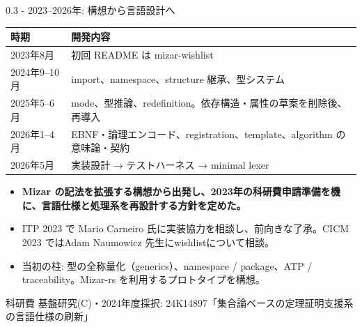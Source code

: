 \documentclass[dvipdfmx,aspectratio=169,11pt]{beamer}
\begin{document}
\begin{frame}[fragile,t]{0.3 - 2023–2026年: 構想から言語設計へ}
\par{}
\begin{footnotesize}
\setlength{\tabcolsep}{3pt}
\renewcommand{\arraystretch}{1.15}
\begin{tabularx}{\textwidth}{l>{\raggedright\arraybackslash}X}
\toprule
\textbf{時期} & \textbf{開発内容} \\
\midrule
2023年8月 & 初回 README は mizar-wishlist \\
2024年9–10月 & import、namespace、structure 継承、型システム \\
2025年5–6月 & mode、型推論、redefinition。依存構造・属性の草案を削除後、再導入 \\
2026年1–4月 & EBNF・論理エンコード、registration、template、algorithm の意味論・契約 \\
2026年5月 & 実装設計 → テストハーネス → minimal lexer \\
\bottomrule
\end{tabularx}
\end{footnotesize}

\begin{itemize}
\setlength{\itemsep}{1pt}
\setlength{\parsep}{0pt}
\setlength{\parskip}{0pt}
\item \textcolor{blue!55!black}{\textbf{Mizar の記法を拡張する構想から出発し、2023年の科研費申請準備を機に、言語仕様と処理系を再設計する方針を定めた。}}
\item ITP 2023 で Mario Carneiro 氏に実装協力を相談し、前向きな了承。CICM 2023 ではAdam Naumowicz 先生にwishlistについて相談。
\item 当初の柱: 型の全称量化（generics）、namespace / package、ATP / traceability。Mizar-rs を利用するプロトタイプを構想。
\end{itemize}
{\footnotesize 科研費 基盤研究(C)・2024年度採択: 24K14897「集合論ベースの定理証明支援系の言語仕様の刷新」}


\end{frame}
\end{document}
